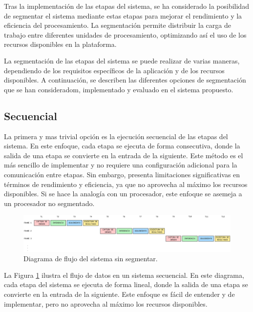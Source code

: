 \documentclass[11pt,spanish,listoffigures,listoftables]{tfgetsinf}
\begin{document}
Tras la implementación de las etapas del sistema, se ha considerado la posibilidad de segmentar el sistema mediante estas etapas para mejorar el rendimiento y la eficiencia del procesamiento. La segmentación permite distribuir la carga de trabajo entre diferentes unidades de procesamiento, optimizando así el uso de los recursos disponibles en la plataforma.

La segmentación de las etapas del sistema se puede realizar de varias maneras, dependiendo de los requisitos específicos de la aplicación y de los recursos disponibles. A continuación, se describen las diferentes opciones de segmentación que se han consideradom, implementado y evaluado en el sistema propuesto.
    
\subsection{Secuencial} \label{sub:secuencial}

La primera y mas trivial opción es la ejecución secuencial de las etapas del sistema. En este enfoque, cada etapa se ejecuta de forma consecutiva, donde la salida de una etapa se convierte en la entrada de la siguiente. Este método es el más sencillo de implementar y no requiere una configuración adicional para la comunicación entre etapas. Sin embargo, presenta limitaciones significativas en términos de rendimiento y eficiencia, ya que no aprovecha al máximo los recursos disponibles. Si se hace la analogía con un procesador, este enfoque se asemeja a un procesador no segmentado.

\begin{figure}[H]
   \centering
   \includegraphics[width=1\textwidth]{images/diseno_e_implementacion/secuencial.png}
   \caption[Diagrama de flujo del sistema sin segmentar]{Diagrama de flujo del sistema sin segmentar.}
   \label{fig:secuencial}
\end{figure}

La Figura \ref{fig:secuencial} ilustra el flujo de datos en un sistema secuencial. En este diagrama, cada etapa del sistema se ejecuta de forma lineal, donde la salida de una etapa se convierte en la entrada de la siguiente. Este enfoque es fácil de entender y de implementar, pero no aprovecha al máximo los recursos disponibles.
\end{document}
